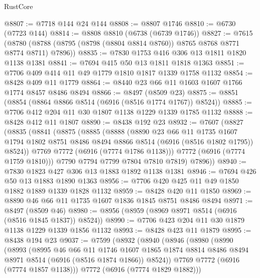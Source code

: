 \begin{lexlean}{RustCore}
\begin{coremodule}
@8807 := @7718 @144 @24 @144
@8808 := @8807 @1746
@8810 := @6730 (@7723 @144)
@8814 := @8808 @8810 (@6738 (@6739 @1746))
@8827 := @7615
    (@8780 (@8788 (@8795 (@8798 (@8804 @8814 @8760)) @8765 @8768 @8771 @8774 @8711) @7896))
@8835 := @7830 @1753 @416 @306 @13 @1811 @1820 @1138 @1381
@8841 := @7694 @415 @50 @13 @1811 @1818 @1363
@8851 := @7706 @409 @414 @11 @49 @1779 @1810 @1817 @1339 @1758 @1132
@8854 := @8428 @409 @11 @1779
@8864 := @8440 @23 @66 @11 @1603 @1607 @1766 @1774 @8457 @8486 @8494
@8866 := @8497 (@8509 @23)
@8875 := @8851 (@8854 (@8864 @8866 @8514 (@6916 (@8516 @1774 @1767)) @8524))
@8885 := @7706 @412 @204 @11 @30 @1807 @1138 @1229 @1339 @1785 @1132
@8888 := @8428 @412 @11 @1807
@8890 := @8438 @192 @23
@8932 := @7607
    (@8827
      (@8835
        (@8841
          (@8875
            (@8885
              (@8888
                (@8890
                  @23
                  @66
                  @11
                  @1735
                  @1607
                  @1794
                  @1802
                  @8751
                  @8486
                  @8494
                  @8866
                  @8514
                  (@6916 (@8516 @1802 @1795))
                  @8524))
              @7769
              @7772
              (@6916 (@7774 @1786 @1138)))
            @7772
            (@6916 (@7774 @1759 @1810)))
          @7790
          @7794
          @7799
          @7804
          @7810
          @7819)
        @7896))
@8940 := @7830 @1823 @427 @306 @13 @1883 @1892 @1138 @1381
@8946 := @7694 @426 @50 @13 @1883 @1890 @1363
@8956 := @7706 @420 @425 @11 @49 @1850 @1882 @1889 @1339 @1828 @1132
@8959 := @8428 @420 @11 @1850
@8969 := @8890 @46 @66 @11 @1735 @1607 @1836 @1845 @8751 @8486 @8494
@8971 := @8497 (@8509 @46)
@8980 := @8956 (@8959 (@8969 @8971 @8514 (@6916 (@8516 @1845 @1837)) @8524))
@8990 := @7706 @423 @204 @11 @30 @1879 @1138 @1229 @1339 @1856 @1132
@8993 := @8428 @423 @11 @1879
@8995 := @8438 @194 @23
@9037 := @7599
    (@8932
      (@8940
        (@8946
          (@8980
            (@8990
              (@8993
                (@8995
                  @46
                  @66
                  @11
                  @1746
                  @1607
                  @1865
                  @1874
                  @8814
                  @8486
                  @8494
                  @8971
                  @8514
                  (@6916 (@8516 @1874 @1866))
                  @8524))
              @7769
              @7772
              (@6916 (@7774 @1857 @1138)))
            @7772
            (@6916 (@7774 @1829 @1882)))

\end{coremodule}
\end{lexlean}
